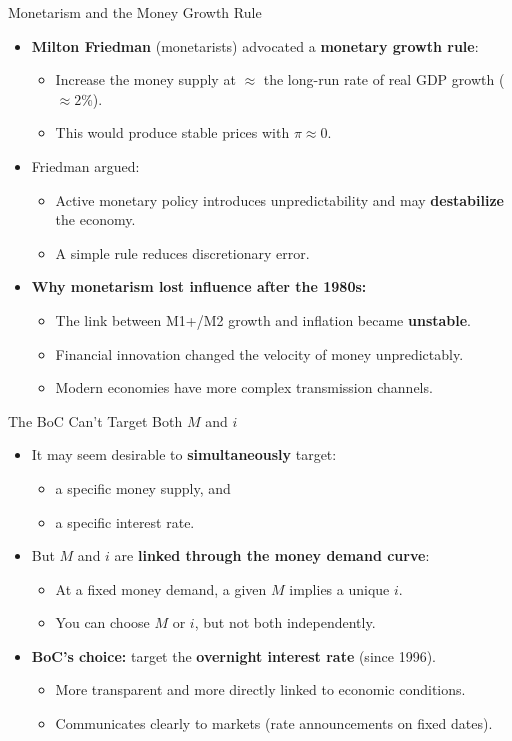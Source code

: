 \documentclass[aspectratio=169]{beamer}
\begin{document}
\begin{frame}{Monetarism and the Money Growth Rule}
\transfade
\begin{itemize}
  \item \textbf{Milton Friedman} (monetarists) advocated a \textbf{monetary growth rule}:
  \begin{itemize}
    \item Increase the money supply at $\approx$ the long-run rate of real GDP growth ($\approx 2\%$).
    \item This would produce stable prices with $\pi \approx 0$.
  \end{itemize}
  \item Friedman argued:
  \begin{itemize}
    \item Active monetary policy introduces unpredictability and may \textbf{destabilize} the economy.
    \item A simple rule reduces discretionary error.
  \end{itemize}
  \item \textbf{Why monetarism lost influence after the 1980s:}
  \begin{itemize}
    \item The link between M1+/M2 growth and inflation became \textbf{unstable}.
    \item Financial innovation changed the velocity of money unpredictably.
    \item Modern economies have more complex transmission channels.
  \end{itemize}
\end{itemize}
\end{frame}

\begin{frame}{The BoC Can't Target Both $M$ and $i$}
\transfade
\begin{itemize}
  \item It may seem desirable to \textbf{simultaneously} target:
  \begin{itemize}
    \item a specific money supply, and
    \item a specific interest rate.
  \end{itemize}
  \item But $M$ and $i$ are \textbf{linked through the money demand curve}:
  \begin{itemize}
    \item At a fixed money demand, a given $M$ implies a unique $i$.
    \item You can choose $M$ or $i$, but not both independently.
  \end{itemize}
  \item \textbf{BoC's choice:} target the \textbf{overnight interest rate} (since 1996).
  \begin{itemize}
    \item More transparent and more directly linked to economic conditions.
    \item Communicates clearly to markets (rate announcements on fixed dates).
  \end{itemize}
\end{itemize}
\end{frame}
\end{document}
